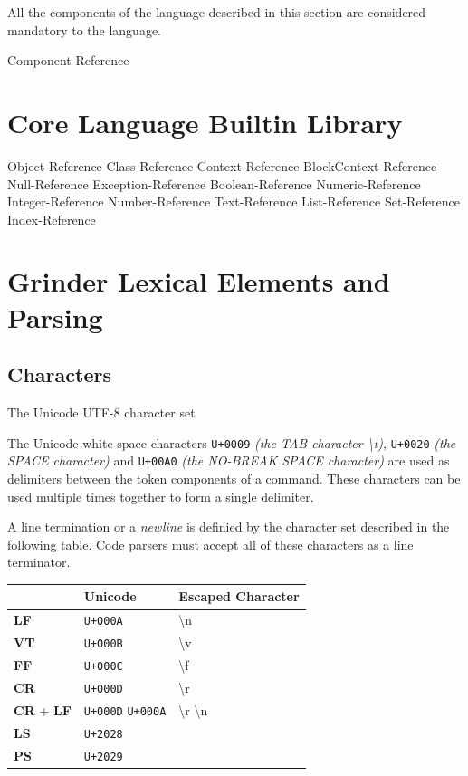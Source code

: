\documentclass [10pt]{article}
\begin{document}
All the components of the language described in this section are considered
mandatory to the language.

 {Component-Reference}

\newpage
\section {Core Language Builtin Library}
 {Object-Reference}
 {Class-Reference}
 {Context-Reference}
 {BlockContext-Reference}
 {Null-Reference}
 {Exception-Reference}
 {Boolean-Reference}
 {Numeric-Reference}
 {Integer-Reference}
 {Number-Reference}
 {Text-Reference}
 {List-Reference}
 {Set-Reference}
 {Index-Reference}

\newpage
\section {Grinder Lexical Elements and Parsing}
\subsection {Characters}
The Unicode UTF-8 character set

The Unicode white space characters \texttt{U+0009}
\textit{(the TAB character \textbackslash t)}, \texttt{U+0020}
\textit{(the SPACE character)} and
\texttt{U+00A0} \textit{(the NO-BREAK SPACE character)} are used as delimiters
between the token components of a command. These characters can be used
multiple times together to form a single delimiter.

A line termination or a \textit{newline} is definied by the character set
described in the following table. Code parsers must accept all of these
characters as a line terminator.

\begin{center}
  \begin{tabular}{|l|l|l|}
    \hline
    & \textbf{Unicode} & \textbf{Escaped Character} \\ \hline
    \textbf{LF} & \texttt{U+000A} & \textbackslash n \\ \hline
    \textbf{VT} & \texttt{U+000B} & \textbackslash v \\ \hline
    \textbf{FF} & \texttt{U+000C} & \textbackslash f \\ \hline
    \textbf{CR} & \texttt{U+000D} & \textbackslash r \\ \hline
    \textbf{CR} + \textbf{LF} & \texttt{U+000D} \texttt{U+000A} &
    \textbackslash r \textbackslash n \\ \hline
    \textbf{LS} & \texttt{U+2028} & \\ \hline
    \textbf{PS} & \texttt{U+2029} & \\ \hline
  \end{tabular}
\end{center}
\end{document}
